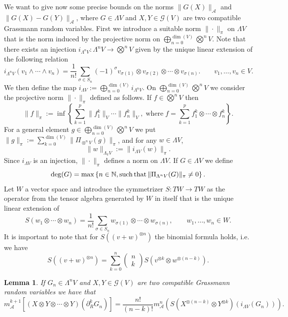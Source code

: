 \documentclass{article}
\newcommand{\assign}{:=}
\newcommand{\tmop}[1]{\ensuremath{\operatorname{#1}}}
\newtheorem{lemma}[theorem]{Lemma}
\begin{document}
We want to give now some precise bounds on the norms $\| G (X)
\|_{\mathcal{A}}$ and $\| G (X) - G (Y) \|_{\mathcal{A}}$, where $G \in
\Lambda V$ and $X, Y \in \mathcal{G} (V)$ are two compatible Grassmann random
variables. First we introduce a suitable norm $\| \cdot \|_{\pi}$ on $\Lambda
V$ that is the norm induced by the projective norm on $\bigoplus_{n = 0}^{\dim
(V)} \bigotimes^n V$. Note that there exists an injection $i_{\Lambda^n V} :
\Lambda^n V \rightarrow \bigotimes^n V$ given by the unique linear extension
of the following relation
\[ i_{\Lambda^n V} (v_1 \wedge \cdots \wedge v_n) = \frac{1}{n!} \sum_{\sigma
   \in S_n} (- 1)^{\sigma} v_{\sigma (1)} \otimes v_{\sigma (2)} \otimes
   \cdots \otimes v_{\sigma (n)} . \qquad v_1, \ldots, v_n \in V. \]
We then define the map $i_{\Lambda V} \assign \bigoplus_{n = 0}^{\dim (V)}
i_{\Lambda^n V}$. On $\bigoplus_{n = 0}^{\dim (V)} \bigotimes^n V$ we consider
the projective norm $\| \cdot \|_{\pi}$ defined as follows. If $f \in
\bigotimes^n V$ then
\[ \| f \|_{\pi} \assign \inf \left\{ \sum_{k = 1}^p \| f_1^k \|_V \cdots \|
   f^k_n \|_V, \tmop{where} f = \sum_{k = 1}^p f^k_1 \otimes \cdots \otimes
   f^k_n \right\} . \]
For a general element $g \in \bigoplus_{n = 0}^{\dim (V)} \bigotimes^n V$ we
put $\| g \|_{\pi} \assign \sum_{k = 0}^{\dim (V)} \| \Pi_{\otimes^n V}  (g)
\|_{\pi}$, and for any $w \in \Lambda V$,
\begin{equation}
  \| w \|_{\Lambda_{\pi} V} \assign \| i_{\Lambda V} (w) \|_{\pi} .
  \label{eq:def-lambdapi-norm}
\end{equation}
Since $i_{\Lambda V}$ is an injection, $\| \cdot \|_{\pi}$ defines a norm on
$\Lambda V$. If $G \in \Lambda V$ we define
\[ \deg (G) = \max \left\{ n \in \mathbb{N}, \tmop{such} \tmop{that} \|
   \Pi_{\Lambda^n V} (G) \|_{\pi} \centernot{=} 0 \right\} . \]
Let $W$ a vector space and introduce the symmetrizer $S : T W \rightarrow T W$
as the operator from the tensor algebra generated by $W$ in itself that is the
unique linear extension of
\[ S (w_1 \otimes \cdots \otimes w_n) = \frac{1}{n!} \sum_{\sigma \in S_n}
   w_{\sigma (1)} \otimes \cdots \otimes w_{\sigma (n)}, \qquad w_1, \ldots,
   w_n \in W. \]
It is important to note that for $S ((v + w)^{\otimes n})$ the binomial
formula holds, i.e. we have
\begin{equation}
  S ((v + w)^{\otimes n}) = \sum_{k = 0}^n \left( \begin{array}{c}
    n\\
    k
  \end{array} \right) S (v^{\otimes k} \otimes w^{\otimes (n - k)}) .
  \label{eq:binomialformula}
\end{equation}
\begin{lemma}
  \label{lemma_tensor}If $G_n \in \Lambda^n V$ and $X, Y \in \mathcal{G} (V)$
  are two compatible Grassmann random variables we have that
  \[ m_{\mathcal{A}}^{k + 1} [(X \otimes Y \otimes \cdots \otimes Y)
     (\partial_R^k G_n)] = \frac{n!}{(n - k) !} m_{\mathcal{A}}^n (S
     (X^{\otimes (n - k)} \otimes Y^{\otimes k}) (i_{\Lambda V} (G_n))) . \]
\end{lemma}
\end{document}
